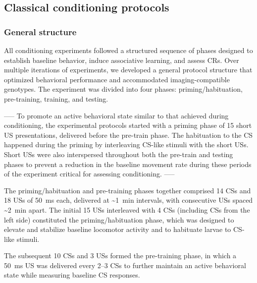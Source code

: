 \subsection{Classical conditioning protocols}


\subsubsection{General structure}

All conditioning experiments followed a structured sequence of phases designed to establish baseline behavior, induce associative learning, and assess CRs. Over multiple iterations of experiments, we developed a general protocol structure that optimized behavioral performance and accommodated imaging-compatible genotypes. The experiment was divided into four phases: priming/habituation, pre-training, training, and testing.

-----
To promote an active behavioral state similar to that achieved during conditioning, the experimental protocols started with a priming phase of 15 short US presentations, delivered before the pre-train phase. The habituation to the CS happened during the priming by interleaving CS-like stimuli with the short USs. Short USs were also interspersed throughout both the pre-train and testing phases to prevent a reduction in the baseline movement rate during these periods of the experiment critical for assessing conditioning.
-----

The priming/habituation and pre-training phases together comprised 14 CSs and 18 USs of \SI{50}{\milli\second} each, delivered at \textasciitilde\SI{1}{\minute} intervals, with consecutive USs spaced \textasciitilde\SI{2}{\minute} apart. The initial 15 USs interleaved with 4 CSs (including CSs from the left side) constituted the priming/habituation phase, which was designed to elevate and stabilize baseline locomotor activity and to habituate larvae to CS-like stimuli.

The subsequent 10 CSs and 3 USs formed the pre-training phase, in which a \SI{50}{\milli\second} US was delivered every 2--3 CSs to further maintain an active behavioral state while measuring baseline CS responses.

